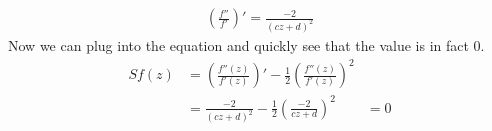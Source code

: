 \documentclass{homework}
\begin{document}
\begin{solution}
                                                                                                                                   \begin{align*}
                                                                                                                                   (\frac{f''}{f'})' = \frac{-2}{(cz + d)^2}
                                                                                                                                   \end{align*}
                                                                                                                                   Now we can plug into the equation and quickly see that the value is in fact 0.
                                                                                                                                   \begin{align*}
                                                                                                                                   Sf(z) &= \left({\frac{f''(z)}{f'(z)}}\right)'-{\frac12}\left(\frac{f''(z)}{f'(z)}\right)^2\\
                                                                                                                                   &= \frac{-2}{(cz + d)^2} - \frac{1}{2}(\frac{-2}{cz + d})^2
                                                                                                                                   &= 0
                                                                                                                                   \end{align*}
                                                                                                                                   \end{solution}
                                                                                                                                   
\end{document}
